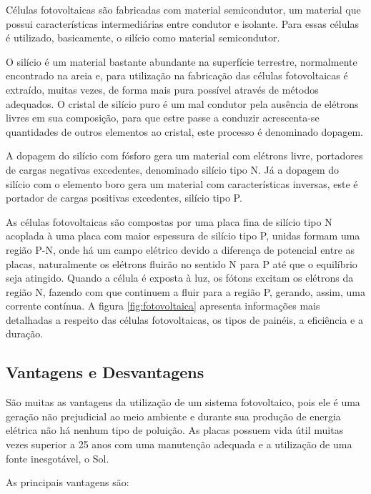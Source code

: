 Células fotovoltaicas são fabricadas com material semicondutor, um material que possui características intermediárias entre condutor e isolante. Para essas células é utilizado, basicamente, o silício como material semicondutor. 
	
O silício é um material bastante abundante na superfície terrestre, normalmente encontrado na areia e, para utilização na fabricação das células fotovoltaicas é extraído, muitas vezes, de forma mais pura possível através de métodos adequados. O cristal de silício puro é um mal condutor pela ausência de elétrons livres em sua composição, para que estre passe a conduzir acrescenta-se quantidades de outros elementos ao cristal, este processo é denominado dopagem.

A dopagem do silício com fósforo gera um material com elétrons livre, portadores de cargas negativas excedentes, denominado silício tipo N. Já a dopagem do silício com o elemento boro gera um material com características inversas, este é portador de cargas positivas excedentes, silício tipo P.

As células fotovoltaicas são compostas por uma placa fina de silício tipo N acoplada à uma placa com maior espessura de silício tipo P, unidas formam uma região P-N, onde há um campo elétrico devido a diferença de potencial entre as placas, naturalmente os elétrons fluirão no sentido N para P até que o equilíbrio seja atingido. Quando a célula é exposta à luz, os fótons excitam os elétrons da região N, fazendo com que continuem a fluir para a região P, gerando, assim, uma corrente contínua. A figura \ref{fig:fotovoltaica} apresenta informações mais detalhadas a respeito das células fotovoltaicas, os tipos de painéis, a eficiência e a duração. 

\subsection{Vantagens e Desvantagens}

São muitas as vantagens da utilização de um sistema fotovoltaico, pois ele é uma geração não prejudicial ao meio ambiente e durante sua produção de energia elétrica não há nenhum tipo de poluição. As placas possuem vida útil muitas vezes superior a 25 anos com uma manutenção adequada e a utilização de uma fonte inesgotável, o Sol.

As principais vantagens são:

